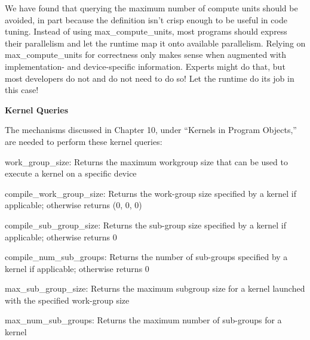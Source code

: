 We have found that querying the maximum number of compute units should be avoided, in part because the definition isn’t crisp enough to be useful in code tuning. Instead of using max\_compute\_units, most programs should express their parallelism and let the runtime map it onto available parallelism. Relying on max\_compute\_units for correctness only makes sense when augmented with implementation- and device-specific information. Experts might do that, but most developers do not and do not need to do so! Let the runtime do its job in this case!\par

\hspace*{\fill} \par %
\textbf{Kernel Queries}

The mechanisms discussed in Chapter 10, under “Kernels in Program Objects,” are needed to perform these kernel queries:\par

work\_group\_size: Returns the maximum workgroup size that can be used to execute a kernel on a specific device\par

compile\_work\_group\_size: Returns the work-group size specified by a kernel if applicable; otherwise returns (0, 0, 0)\par

compile\_sub\_group\_size: Returns the sub-group size specified by a kernel if applicable; otherwise returns 0\par

compile\_num\_sub\_groups: Returns the number of sub-groups specified by a kernel if applicable; otherwise returns 0\par

max\_sub\_group\_size: Returns the maximum subgroup size for a kernel launched with the specified work-group size\par

max\_num\_sub\_groups: Returns the maximum number of sub-groups for a kernel\par











